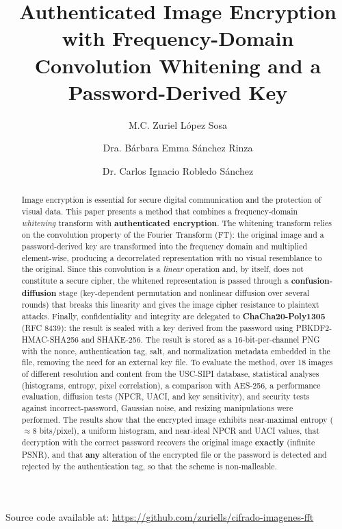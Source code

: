 \documentclass{llncs}
\begin{document}
\title{Authenticated Image Encryption with Frequency-Domain Convolution Whitening and a Password-Derived Key}

\author{M.C. Zuriel L\'opez Sosa \and Dra. B\'arbara Emma S\'anchez Rinza \and
Dr. Carlos Ignacio Robledo S\'anchez}

\maketitle

\begin{center}
Source code available at: \url{https://github.com/zuriells/cifrado-imagenes-fft}
\end{center}

\begin{abstract}
Image encryption is essential for secure digital communication and the
protection of visual data. This paper presents a method that combines a
frequency-domain \emph{whitening} transform with \textbf{authenticated
encryption}. The whitening transform relies on the convolution property of
the Fourier Transform (FT): the original image and a password-derived key
are transformed into the frequency domain and multiplied element-wise,
producing a decorrelated representation with no visual resemblance to the
original. Since this convolution is a \emph{linear} operation and, by
itself, does not constitute a secure cipher, the whitened representation is
passed through a \textbf{confusion-diffusion} stage (key-dependent
permutation and nonlinear diffusion over several rounds) that breaks this
linearity and gives the image cipher resistance to plaintext attacks.
Finally, confidentiality and integrity are delegated to
\textbf{ChaCha20-Poly1305} (RFC 8439): the result is sealed with a key
derived from the password using PBKDF2-HMAC-SHA256 and SHAKE-256. The result is stored as a
16-bit-per-channel PNG with the nonce, authentication tag, salt, and
normalization metadata embedded in the file, removing the need for an
external key file. To evaluate the method, over 18 images of different
resolution and content from the USC-SIPI database, statistical analyses
(histograms, entropy, pixel correlation), a comparison with AES-256, a
performance evaluation, diffusion tests (NPCR, UACI, and key sensitivity), and
security tests against incorrect-password, Gaussian noise, and resizing
manipulations were performed. The results show that the encrypted image
exhibits near-maximal entropy ($\approx 8$ bits/pixel), a uniform histogram,
and near-ideal NPCR and UACI values, that decryption with the correct
password recovers the original image \textbf{exactly} (infinite PSNR), and
that \textbf{any}
alteration of the encrypted file or the password is detected and rejected by
the authentication tag, so that the scheme is non-malleable.

\end{abstract}
\end{document}
